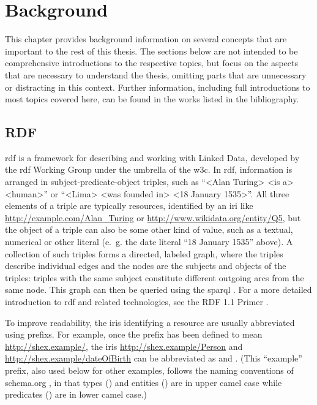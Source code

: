 
\chapter{Background}
\label{ch:Background}

This chapter provides background information
on several concepts that are important to the rest of this thesis.
The sections below are not intended to be comprehensive introductions to the respective topics,
but focus on the aspects that are necessary to understand the thesis,
omitting parts that are unnecessary or distracting in this context.
Further information, including full introductions to most topics covered here,
can be found in the works listed in the bibliography.

\section{RDF}
\label{sec:Background:RDF}

\acrfull{rdf}
\cite{Lanthaler:14:RCA}
is a framework for describing and working with \gls{Linked Data},
developed by the \gls{rdf} Working Group under the umbrella of the \gls{w3c}.
In \gls{rdf}, information is arranged in \gls{subject}-\gls{predicate}-\gls{object} \glspl{triple},
such as “<Alan Turing> <is a> <human>”
or “<Lima> <was founded in> <18 January 1535>”.
All three elements of a \gls{triple} are typically \glspl{resource},
identified by an \gls{iri} like \url{http://example.com/Alan_Turing} or \url{http://www.wikidata.org/entity/Q5},
but the \gls{object} of a \gls{triple} can also be some other kind of value,
such as a textual, numerical or other literal
(e.~g. the date literal “18 January 1535” above).
A collection of such \glspl{triple} forms a directed, labeled graph,
where the \glspl{triple} describe individual edges
and the nodes are the \glspl{subject} and \glspl{object} of the \glspl{triple}:
\glspl{triple} with the same \gls{subject} constitute different outgoing arcs from the same node.
This graph can then be queried using the \acrfull{sparql} \cite{9569543}.
For a more detailed introduction to \gls{rdf} and related technologies,
see the RDF 1.1 Primer \cite{Schreiber:14:RP}.

To improve readability, the \glspl{iri} identifying a \gls{resource}
are usually abbreviated using \glspl{prefix}.
For example, once the \gls{prefix}  has been defined to mean \url{http://shex.example/},
the \glspl{iri} \url{http://shex.example/Person} and \url{http://shex.example/dateOfBirth}
can be abbreviated as  and .
(This “example” \gls{prefix}, also used below for other examples,
follows the naming conventions of schema.org \cite{schema.org-old-extension},
in that types () and entities () are in upper camel case
while predicates () are in lower camel case.)

